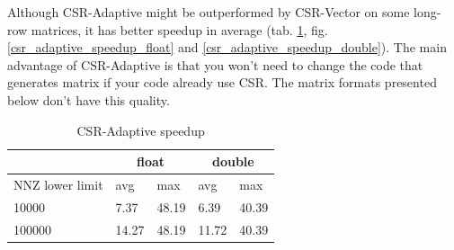\documentclass{article}
\begin{document}
Although CSR-Adaptive might be outperformed by CSR-Vector on some long-row matrices, it has better speedup in average (tab. \ref{csr_vector_speedup_table}, 
fig. \ref{csr_adaptive_speedup_float} and \ref{csr_adaptive_speedup_double}). The main advantage of CSR-Adaptive is that you won't need to change
the code that generates matrix if your code already use CSR. The matrix formats presented below don't have this quality.

\begin{table}[H]
	\centering
	\begin{tabular}{ |p{2.6cm}||p{1cm}|p{1cm}|p{1cm}|p{1cm}|  }
	 \hline
		& \multicolumn{2}{|c|}{float} & \multicolumn{2}{|c|}{double}\\
	 \hline
	 NNZ lower limit & avg & max & avg & max  \\
	 \hline
	 10000  & 7.37  & 48.19 & 6.39 & 40.39 \\
	 100000 & 14.27 & 48.19 & 11.72 & 40.39 \\
	 \hline
	\end{tabular}
	\caption{CSR-Adaptive speedup}
  \label{csr_vector_speedup_table}
\end{table}

\begin{figure}[H]
\centering
{}
\qquad %
\end{figure}
\end{document}
